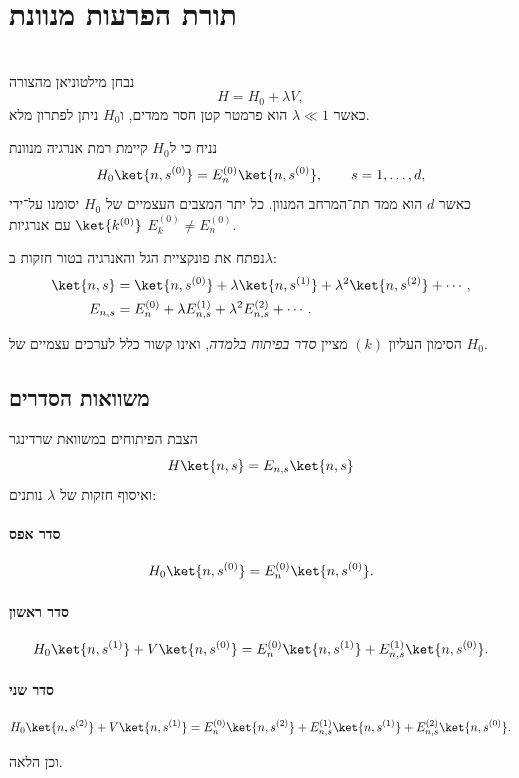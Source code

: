 \section{תורת הפרעות מנוונת}
\date{01.01.2026}
\\
נבחן מילטוניאן מהצורה
\[
H = H_0 + \lambda V,
\]
כאשר $\lambda \ll 1$ הוא פרמטר קטן חסר ממדים, ו$H_0$ ניתן לפתרון מלא.

נניח כי ל$H_0$ קיימת רמת אנרגיה מנוונת
\[
H_0 \ket{n,s^{(0)}} = E_n^{(0)} \ket{n,s^{(0)}},
\qquad s = 1,\dots,d,
\]
כאשר $d$ הוא ממד תת־המרחב המנוון. כל יתר המצבים העצמיים של $H_0$ יסומנו על־ידי $\ket{k^{(0)}}$ עם אנרגיות $E_k^{(0)} \neq E_n^{(0)}$.

נפתח את פונקציית הגל והאנרגיה בטור חזקות ב$\lambda$:
\begin{align}
\ket{n,s} &= \ket{n,s^{(0)}} + \lambda \ket{n,s^{(1)}} + \lambda^2 \ket{n,s^{(2)}} + \cdots, \\
E_{n,s} &= E_n^{(0)} + \lambda E_{n,s}^{(1)} + \lambda^2 E_{n,s}^{(2)} + \cdots.
\end{align}

הסימון העליון $(k)$ מציין \emph{סדר בפיתוח בלמדה}, ואינו קשור כלל לערכים עצמיים של $H_0$.

\subsection{משוואות הסדרים}

הצבת הפיתוחים במשוואת שרדינגר
\[
H\ket{n,s} = E_{n,s}\ket{n,s}
\]
ואיסוף חזקות של $\lambda$ נותנים:

\paragraph{סדר אפס}
\[
H_0 \ket{n,s^{(0)}} = E_n^{(0)} \ket{n,s^{(0)}}.
\]

\paragraph{סדר ראשון}
\[
H_0 \ket{n,s^{(1)}} + V \ket{n,s^{(0)}}
=
E_n^{(0)} \ket{n,s^{(1)}} + E_{n,s}^{(1)} \ket{n,s^{(0)}}.
\]

\paragraph{סדר שני}
\[
H_0 \ket{n,s^{(2)}} + V \ket{n,s^{(1)}}
=
E_n^{(0)} \ket{n,s^{(2)}}
+ E_{n,s}^{(1)} \ket{n,s^{(1)}}
+ E_{n,s}^{(2)} \ket{n,s^{(0)}}.
\]

וכן הלאה.



